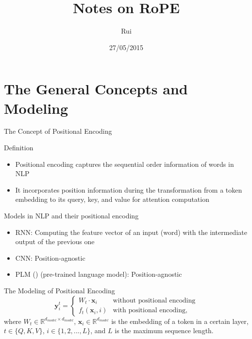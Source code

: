 \documentclass{beamer}
\title[Notes on RoPE]{Notes on RoPE}
\author{Rui}
\institute{Independent}
\date{27/05/2015}
\begin{document}
	
	\begin{frame}
		\titlepage
	\end{frame}
	
	
	\begin{frame}[plain]
		\tableofcontents
	\end{frame}
	
	\section{The General Concepts and Modeling}
	
	\begin{frame}{The Concept of Positional Encoding}		
		\begin{block}{Definition}
			\begin{itemize}
				\item Positional encoding captures the sequential order information of words in NLP
				\item It incorporates position information during the transformation from a token embedding to its query, key, and value for attention computation
			\end{itemize}
		\end{block}
		\begin{block}{Models in NLP and their positional encoding}
			\begin{itemize}
				\item RNN: Computing the feature vector of an input (word) with the intermediate output of the previous one
				\item CNN: Position-agnostic
				\item PLM (\cite{su2023roformerenhancedtransformerrotary}) (pre-trained language model): Position-agnostic
			\end{itemize}
		\end{block}
	\end{frame}
	
	\begin{frame}{The Modeling of Positional Encoding}
		\begin{equation}
			\mathbf{y}_i^t = 
			\begin{cases} 
				W_t \cdot \mathbf{x}_i & \text{without positional encoding} \\
				f_t(\mathbf{x}_i, i) & \text{with positional encoding},					
			\end{cases}
		\end{equation}
		where $W_t \in \mathbb{R}^{d_{model} \times d_{model}}$, $\mathbf{x}_i \in \mathbb{R}^{d_{model}}$ is the embedding of a token in a certain layer, $t\in\{Q, K, V\}$, $i\in\{1,2,...,L\}$, and $L$ is the maximum sequence length.
	\end{frame}
	
\end{document}
